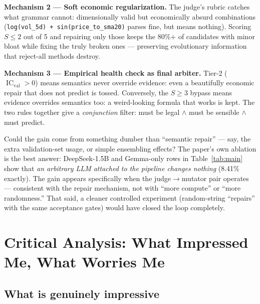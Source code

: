\documentclass[11pt,a4paper]{article}
\newcommand{\code}[1]{\texttt{#1}}
\begin{document}
\textbf{Mechanism 2 --- Soft economic regularization.} The judge's rubric
catches what grammar cannot: dimensionally valid but economically absurd
combinations (\code{log(vol\_5d) + sin(price\_to\_sma20)} parses fine, but
means nothing). Scoring $S \le 2$ out of 5 and repairing only those keeps the
80\%+ of candidates with minor bloat while fixing the truly broken ones ---
preserving evolutionary information that reject-all methods destroy.

\textbf{Mechanism 3 --- Empirical health check as final arbiter.}
Tier-2 ($\operatorname{IC}_{\text{val}} > 0$) means semantics never override
evidence: even a beautifully economic repair that does not predict is tossed.
Conversely, the $S \ge 3$ bypass means evidence overrides semantics too: a
weird-looking formula that works is kept. The two rules together give a
\emph{conjunction} filter: must be legal $\wedge$ must be sensible $\wedge$
must predict.

\begin{scrutiny}
Could the gain come from something dumber than ``semantic repair'' --- say,
the extra validation-set usage, or simple ensembling effects? The paper's
own ablation is the best answer: DeepSeek-1.5B and Gemma-only rows in
Table~\ref{tab:main} show that \emph{an arbitrary LLM attached to the
pipeline changes nothing} (8.41\% exactly). The gain appears specifically
when the judge$\to$mutator pair operates --- consistent with the repair
mechanism, not with ``more compute'' or ``more randomness.'' That said, a
cleaner controlled experiment (random-string ``repairs'' with the same
acceptance gates) would have closed the loop completely.
\end{scrutiny}

\section{Critical Analysis: What Impressed Me, What Worries Me}
\label{sec:critique}

\subsection*{What is genuinely impressive}
\end{document}
